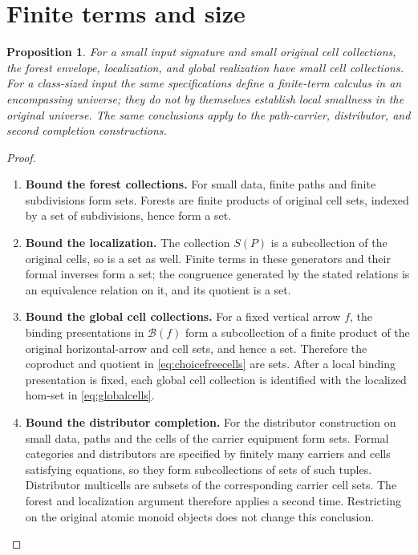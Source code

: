 \documentclass[11pt,reqno]{amsart}
\theoremstyle{plain}
\newtheorem{proposition}[theorem]{Proposition}
\theoremstyle{definition}
\theoremstyle{remark}
\numberwithin{equation}{section}
\begin{document}
\section{Finite terms and size}\label{app:size}

\begin{proposition}
For a small input signature and small original cell collections, the
forest envelope, localization, and global realization have small cell
collections. For a class-sized input the same specifications define a
finite-term calculus in an encompassing universe; they do not by
themselves establish local smallness in the original universe.
The same conclusions apply to the path-carrier, distributor, and second
completion constructions.
\end{proposition}
\begin{proof}\leavevmode
\begin{enumerate}
\item \textbf{Bound the forest collections.} For small data, finite paths and finite subdivisions form sets.
Forests are finite products of original cell sets, indexed by a set
of subdivisions, hence form a set.

\item \textbf{Bound the localization.} The collection $S(P)$ is a
subcollection of the original cells, so is a set as well. Finite
terms in these generators and their formal inverses form a set;
the congruence generated by the stated relations is an equivalence
relation on it, and its quotient is a set.

\item \textbf{Bound the global cell collections.} For a fixed vertical arrow $f$,
the binding presentations in $\mathcal B(f)$ form a subcollection of a
finite product of the original horizontal-arrow and cell sets, and hence a
set. Therefore the coproduct and quotient in \cref{eq:choicefreecells} are
sets. After a local binding presentation is fixed, each global cell
collection is identified with the localized hom-set in
\cref{eq:globalcells}.

\item \textbf{Bound the distributor completion.} For the distributor construction on small data, paths and the cells of
the carrier equipment form sets. Formal categories and distributors are
specified by finitely many carriers and cells satisfying equations, so
they form subcollections of sets of such tuples. Distributor multicells
are subsets of the corresponding carrier cell sets. The forest and
localization argument therefore applies a second time. Restricting on
the original atomic monoid objects does not change this conclusion.


\end{enumerate}
\end{proof}
\end{document}
